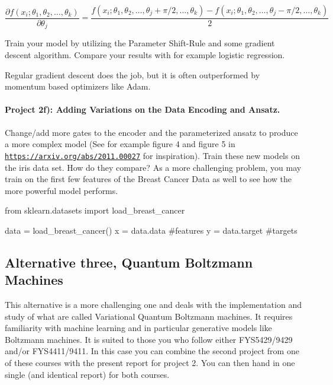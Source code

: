 \documentclass[%
oneside,                 %
final,                   %
10pt]{article}
\begin{document}
\begin{equation*}
    \frac{\partial f(x_i; \theta_1, \theta_2, \dots, \theta_k)}{\partial \theta_j}  = \frac{f(x_i; \theta_1, \theta_2, \dots, \theta_j + \pi /2, \dots, \theta_k) -f(x_i; \theta_1, \theta_2, \dots, \theta_j - \pi /2, \dots, \theta_k)}{2}
\end{equation*}

Train your model by utilizing the Parameter Shift-Rule and some
gradient descent algorithm. Compare your results with for example
logistic regression.

Regular gradient descent does the job, but it is often outperformed by momentum based optimizers like Adam.

\paragraph{Project 2f): Adding Variations on the Data Encoding and Ansatz.}
Change/add more gates to the encoder and the parameterized ansatz to produce a more complex model (See for example figure 4 and figure 5 in \href{{https://arxiv.org/abs/2011.00027}}{\nolinkurl{https://arxiv.org/abs/2011.00027}} for inspiration). Train these new models on the iris data set. How do they compare? As a more challenging problem, you may train on the first few features of the Breast Cancer Data as well to see how the more powerful model performs.







\bpycod
from sklearn.datasets import load_breast_cancer

data = load_breast_cancer()
x = data.data #features
y = data.target #targets

\epycod


\subsection{Alternative three, Quantum Boltzmann Machines}

This alternative is a more challenging one and deals with the
implementation and study of what are called Variational Quantum
Boltzmann machines.  It requires familiarity with machine learning and
in particular generative models like Boltzmann machines. It is suited
to those you who follow either FYS5429/9429 and/or FYS4411/9411. In
this case you can combine the second project from one of these courses
with the present report for project 2. You can then hand in one single
(and identical report) for both courses.
\end{document}
